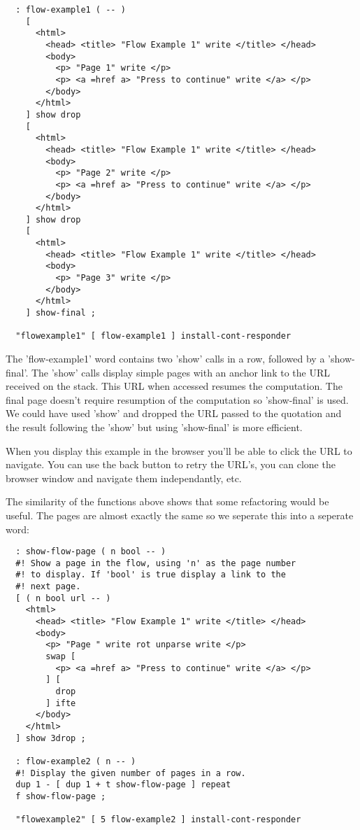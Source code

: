 \begin{verbatim}
  : flow-example1 ( -- )
    [
      <html>
        <head> <title> "Flow Example 1" write </title> </head>
        <body>
          <p> "Page 1" write </p>
          <p> <a =href a> "Press to continue" write </a> </p>
        </body>
      </html>   
    ] show drop 
    [
      <html>
        <head> <title> "Flow Example 1" write </title> </head>
        <body>
          <p> "Page 2" write </p>
          <p> <a =href a> "Press to continue" write </a> </p>
        </body>
      </html>   
    ] show drop 
    [
      <html>
        <head> <title> "Flow Example 1" write </title> </head>
        <body>
          <p> "Page 3" write </p>
        </body>
      </html>   
    ] show-final ;

  "flowexample1" [ flow-example1 ] install-cont-responder
\end{verbatim}

The 'flow-example1' word contains two 'show' calls in a row, followed
by a 'show-final'. The 'show' calls display simple pages with an anchor
link to the URL received on the stack. This URL when accessed resumes
the computation. The final page doesn't require resumption of the
computation so 'show-final' is used. We could have used 'show' and
dropped the URL passed to the quotation and the result following the
'show' but using 'show-final' is more efficient.

When you display this example in the browser you'll be able to click
the URL to navigate. You can use the back button to retry the URL's,
you can clone the browser window and navigate them independantly, etc.

The similarity of the functions above shows that some refactoring
would be useful. The pages are almost exactly the same so we seperate
this into a seperate word:

\begin{verbatim}
  : show-flow-page ( n bool -- )
  #! Show a page in the flow, using 'n' as the page number
  #! to display. If 'bool' is true display a link to the 
  #! next page.
  [ ( n bool url -- )
    <html>
      <head> <title> "Flow Example 1" write </title> </head>
      <body>
        <p> "Page " write rot unparse write </p>
        swap [
          <p> <a =href a> "Press to continue" write </a> </p>
        ] [
          drop 
        ] ifte
      </body>
    </html>   
  ] show 3drop ;

  : flow-example2 ( n -- )
  #! Display the given number of pages in a row.
  dup 1 - [ dup 1 + t show-flow-page ] repeat
  f show-flow-page ;
 
  "flowexample2" [ 5 flow-example2 ] install-cont-responder
\end{verbatim}

